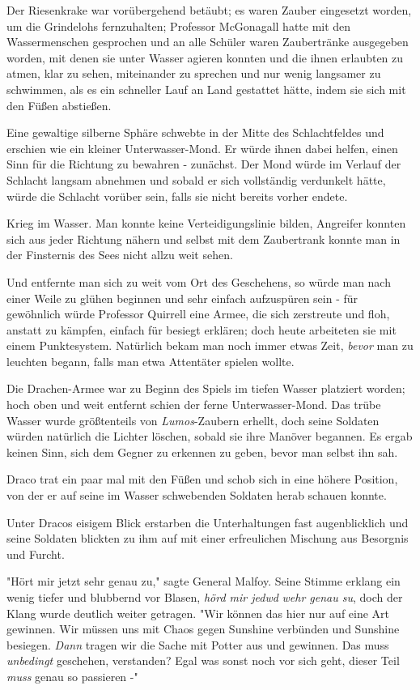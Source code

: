 {Der Riesenkrake war vorübergehend betäubt; es waren Zauber eingesetzt worden, um die Grindelohs fernzuhalten; Professor McGonagall hatte mit den Wassermenschen gesprochen und an alle Schüler waren Zaubertränke ausgegeben worden, mit denen sie unter Wasser agieren konnten und die ihnen erlaubten zu atmen, klar zu sehen, miteinander zu sprechen und nur wenig langsamer zu schwimmen, als es ein schneller Lauf an Land gestattet hätte, indem sie sich mit den Füßen abstießen.

Eine gewaltige silberne Sphäre schwebte in der Mitte des Schlachtfeldes und erschien wie ein kleiner Unterwasser-Mond. Er würde ihnen dabei helfen, einen Sinn für die Richtung zu bewahren - zunächst. Der Mond würde im Verlauf der Schlacht langsam abnehmen und sobald er sich vollständig verdunkelt hätte, würde die Schlacht vorüber sein, falls sie nicht bereits vorher endete.

Krieg im Wasser. Man konnte keine Verteidigungslinie bilden, Angreifer konnten sich aus jeder Richtung nähern und selbst mit dem Zaubertrank konnte man in der Finsternis des Sees nicht allzu weit sehen.

Und entfernte man sich zu weit vom Ort des Geschehens, so würde man nach einer Weile zu glühen beginnen und sehr einfach aufzuspüren sein - für gewöhnlich würde Professor Quirrell eine Armee, die sich zerstreute und floh, anstatt zu kämpfen, einfach für besiegt erklären; doch heute arbeiteten sie mit einem Punktesystem. Natürlich bekam man noch immer etwas Zeit, \emph{bevor} man zu leuchten begann, falls man etwa Attentäter spielen wollte.

Die Drachen-Armee war zu Beginn des Spiels im tiefen Wasser platziert worden; hoch oben und weit entfernt schien der ferne Unterwasser-Mond. Das trübe Wasser wurde größtenteils von \emph{Lumos}-Zaubern erhellt, doch seine Soldaten würden natürlich die Lichter löschen, sobald sie ihre Manöver begannen. Es ergab keinen Sinn, sich dem Gegner zu erkennen zu geben, bevor man selbst ihn sah.

Draco trat ein paar mal mit den Füßen und schob sich in eine höhere Position, von der er auf seine im Wasser schwebenden Soldaten herab schauen konnte.

Unter Dracos eisigem Blick erstarben die Unterhaltungen fast augenblicklich und seine Soldaten blickten zu ihm auf mit einer erfreulichen Mischung aus Besorgnis und Furcht.

"Hört mir jetzt sehr genau zu," sagte General Malfoy. Seine Stimme erklang ein wenig tiefer und blubbernd vor Blasen, \emph{hörd mir jedwd} \emph{wehr genau su}, doch der Klang wurde deutlich weiter getragen. "Wir können das hier nur auf eine Art gewinnen. Wir müssen uns mit Chaos gegen Sunshine verbünden und Sunshine besiegen. \emph{Dann} tragen wir die Sache mit Potter aus und gewinnen. Das muss \emph{unbedingt} geschehen, verstanden? Egal was sonst noch vor sich geht, dieser Teil \emph{muss} genau so passieren -"

}
